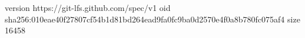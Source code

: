 version https://git-lfs.github.com/spec/v1
oid sha256:010eae40f27807cf54b1d81bd264ead9fa0fc9ba0d2570e4f0a8b780fc075af4
size 16458

